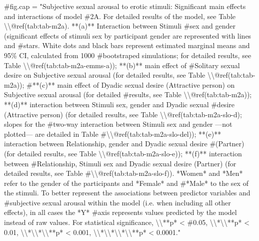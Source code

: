\documentclass[
  bookmarksnumbered]{article}
\newenvironment{Shaded}{\begin{snugshade}}{\end{snugshade}}
\newcommand{\CommentTok}[1]{\textcolor[rgb]{0.50,0.62,0.50}{#1}}
\begin{document}
\begin{Shaded}
\begin{Highlighting}[]
\CommentTok{\#fig.cap = "Subjective sexual arousal to erotic stimuli: Significant main effects and interactions of model \#2A. For detailed results of the model, see Table \textbackslash{}\textbackslash{}@ref(tab:tab{-}m2a). **(a)** Interaction between Stimuli \#sex and gender (significant effects of stimuli sex by participant gender are represented with lines and \#stars. White dots and black bars represent estimated marginal means and 95\% CI, calculated from 1000 \#bootstraped simulations; for detailed results, see Table \textbackslash{}\textbackslash{}@ref(tab:tab{-}m2a{-}emms{-}a)); **(b)** main effect of \#Solitary sexual desire on Subjective sexual arousal (for detailed results, see Table \textbackslash{}\textbackslash{}@ref(tab:tab{-}m2a)); \#**(c)** main effect of Dyadic sexual desire (Attractive person) on Subjective sexual arousal  (for detailed \#results, see Table \textbackslash{}\textbackslash{}@ref(tab:tab{-}m2a)); **(d)** interaction between Stimuli sex, gender and Dyadic sexual \#desire (Attractive person) (for detailed results, see Table \textbackslash{}\textbackslash{}@ref(tab:tab{-}m2a{-}slo{-}d); slopes for the \#two{-}way interaction between Stimuli sex and gender —not plotted— are detailed in Table \#\textbackslash{}\textbackslash{}@ref(tab:tab{-}m2a{-}slo{-}del)); **(e)** interaction between Relationship, gender and Dyadic sexual desire \#(Partner) (for detailed results, see Table \textbackslash{}\textbackslash{}@ref(tab:tab{-}m2a{-}slo{-}e)); **(f)** interaction between \#Relationship, Stimuli sex and Dyadic sexual desire (Partner) (for detailed results, see Table \#\textbackslash{}\textbackslash{}@ref(tab:tab{-}m2a{-}slo{-}f)). *Women* and *Men* refer to the gender of the participants and *Female* and \#*Male* to the sex of the stimuli. To better represent the associations between predictor variables and \#subjective sexual arousal within the model (i.e. when including all other effects), in all cases the *Y* \#axis represents values predicted by the model instead of raw values. For statistical significance, \textbackslash{}\textbackslash{}**p* \textless{} \#0.05, \textbackslash{}\textbackslash{}*\textbackslash{}\textbackslash{}**p* \textless{} 0.01, \textbackslash{}\textbackslash{}*\textbackslash{}\textbackslash{}*\textbackslash{}\textbackslash{}**p* \textless{} 0.001, \textbackslash{}\textbackslash{}*\textbackslash{}\textbackslash{}*\textbackslash{}\textbackslash{}*\textbackslash{}\textbackslash{}**p* \textless{} 0.0001."}



\end{Highlighting}
\end{Shaded}
\end{document}

